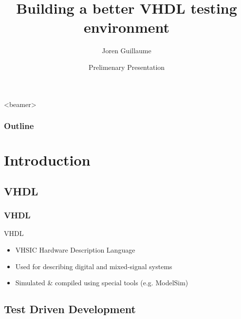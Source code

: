 \documentclass[british,10pt]{beamer}
\title{Building a better VHDL testing environment}
\author[J. Guillaume]{Joren Guillaume}
\date[DEC'14, Gent]{Prelimenary Presentation}
\institute[Ghent University]
{
  FEA\\
  Ghent University
}
\begin{document}
\begin{frame}[plain]
  \titlepage
\end{frame}



\begin{frame}<beamer>\frametitle{Outline}
  \tableofcontents
\end{frame}

\section{Introduction}
\subsection{VHDL}

\begin{frame}\frametitle{VHDL}
VHDL
\begin{itemize}
\item VHSIC Hardware Description Language
\item Used for describing digital and mixed-signal systems 
\item Simulated \& compiled using special tools (e.g. ModelSim)
\end{itemize}
\end{frame}

\subsection{Test Driven Development}
\end{document}
